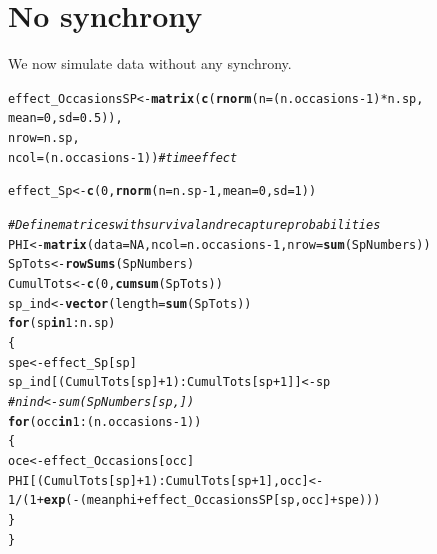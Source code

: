 \documentclass[a4paper, 10pt]{scrartcl}\usepackage[]{graphicx}\usepackage[]{color}
\makeatletter
\newcommand{\hlnum}[1]{\textcolor[rgb]{0.686,0.059,0.569}{#1}}%
\newcommand{\hlcom}[1]{\textcolor[rgb]{0.678,0.584,0.686}{\textit{#1}}}%
\newcommand{\hlopt}[1]{\textcolor[rgb]{0,0,0}{#1}}%
\newcommand{\hlstd}[1]{\textcolor[rgb]{0.345,0.345,0.345}{#1}}%
\newcommand{\hlkwa}[1]{\textcolor[rgb]{0.161,0.373,0.58}{\textbf{#1}}}%
\newcommand{\hlkwb}[1]{\textcolor[rgb]{0.69,0.353,0.396}{#1}}%
\newcommand{\hlkwc}[1]{\textcolor[rgb]{0.333,0.667,0.333}{#1}}%
\newcommand{\hlkwd}[1]{\textcolor[rgb]{0.737,0.353,0.396}{\textbf{#1}}}%
\newenvironment{kframe}{%
 \def\at@end@of@kframe{}%
 \ifinner\ifhmode%
  \def\at@end@of@kframe{\end{minipage}}%
  \begin{minipage}{\columnwidth}%
 \fi\fi%
 \def\FrameCommand##1{\hskip\@totalleftmargin \hskip-\fboxsep
 \colorbox{shadecolor}{##1}\hskip-\fboxsep
     \hskip-\linewidth \hskip-\@totalleftmargin \hskip\columnwidth}%
 \MakeFramed {\advance\hsize-\width
   \@totalleftmargin\z@ \linewidth\hsize
   \@setminipage}}%
 {\par\unskip\endMakeFramed%
 \at@end@of@kframe}
\newenvironment{knitrout}{}{} %
\makeatother
\begin{document}
\section{No synchrony}
We now simulate data without any synchrony.
\begin{knitrout}
\color{fgcolor}\begin{kframe}
\begin{alltt}
\hlstd{effect_OccasionsSP}\hlkwb{<-}\hlkwd{matrix}\hlstd{(}\hlkwd{c}\hlstd{(}\hlkwd{rnorm}\hlstd{(}\hlkwc{n} \hlstd{= (n.occasions}\hlopt{-}\hlnum{1}\hlstd{)}\hlopt{*}\hlstd{n.sp,}
                                   \hlkwc{mean} \hlstd{=} \hlnum{0}\hlstd{,}\hlkwc{sd} \hlstd{=} \hlnum{0.5}\hlstd{)),}
                           \hlkwc{nrow}\hlstd{=n.sp,}
                           \hlkwc{ncol}\hlstd{=(n.occasions}\hlopt{-}\hlnum{1}\hlstd{))}\hlcom{#time effect}

\hlstd{effect_Sp}\hlkwb{<-}\hlkwd{c}\hlstd{(}\hlnum{0}\hlstd{,}\hlkwd{rnorm}\hlstd{(}\hlkwc{n} \hlstd{= n.sp}\hlopt{-}\hlnum{1}\hlstd{,}\hlkwc{mean}\hlstd{=}\hlnum{0}\hlstd{,}\hlkwc{sd}\hlstd{=}\hlnum{1}\hlstd{))}


\hlcom{# Define matrices with survival and recapture probabilities}
\hlstd{PHI} \hlkwb{<-} \hlkwd{matrix}\hlstd{(} \hlkwc{data} \hlstd{=} \hlnum{NA}\hlstd{,} \hlkwc{ncol} \hlstd{= n.occasions}\hlopt{-}\hlnum{1}\hlstd{,} \hlkwc{nrow} \hlstd{=} \hlkwd{sum}\hlstd{( SpNumbers) )}
\hlstd{SpTots} \hlkwb{<-} \hlkwd{rowSums}\hlstd{(SpNumbers)}
\hlstd{CumulTots} \hlkwb{<-} \hlkwd{c}\hlstd{(}\hlnum{0}\hlstd{,} \hlkwd{cumsum}\hlstd{(SpTots))}
\hlstd{sp_ind} \hlkwb{<-} \hlkwd{vector}\hlstd{(}\hlkwc{length} \hlstd{=} \hlkwd{sum}\hlstd{(SpTots))}
\hlkwa{for} \hlstd{(sp} \hlkwa{in} \hlnum{1}\hlopt{:}\hlstd{n.sp)}
\hlstd{\{}
  \hlstd{spe} \hlkwb{<-}  \hlstd{effect_Sp[sp]}
  \hlstd{sp_ind[(CumulTots[sp]}\hlopt{+}\hlnum{1}\hlstd{)}\hlopt{:}\hlstd{CumulTots[sp}\hlopt{+}\hlnum{1}\hlstd{]]} \hlkwb{<-} \hlstd{sp}
  \hlcom{#nind <- sum(SpNumbers[sp,])}
  \hlkwa{for} \hlstd{(occ} \hlkwa{in} \hlnum{1}\hlopt{:}\hlstd{(n.occasions}\hlopt{-}\hlnum{1}\hlstd{))}
  \hlstd{\{}
    \hlstd{oce} \hlkwb{<-} \hlstd{effect_Occasions[occ]}
    \hlstd{PHI[(CumulTots[sp]}\hlopt{+}\hlnum{1}\hlstd{)}\hlopt{:}\hlstd{CumulTots[sp}\hlopt{+}\hlnum{1}\hlstd{],occ]} \hlkwb{<-}
      \hlnum{1}\hlopt{/}\hlstd{(}\hlnum{1}\hlopt{+}\hlkwd{exp}\hlstd{(}\hlopt{-}\hlstd{( meanphi} \hlopt{+} \hlstd{effect_OccasionsSP[sp,occ]} \hlopt{+} \hlstd{spe) ) )}
  \hlstd{\}}
\hlstd{\}}
\end{alltt}
\end{kframe}
\end{knitrout}
\end{document}
